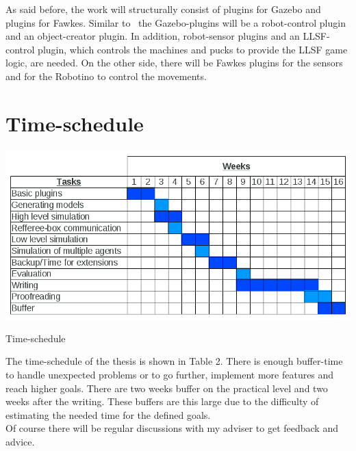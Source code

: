 \documentclass[11pt,a4paper]{article}
\begin{document}
As said before, the work will structurally consist of plugins for Gazebo and plugins for Fawkes. Similar to~\cite{KlingenDA} the Gazebo-plugins will be a robot-control plugin and an object-creator plugin. In addition, robot-sensor plugins and an LLSF-control plugin, which controls the machines and pucks to provide the LLSF game logic,  are needed. On the other side, there will be Fawkes plugins  for the sensors and for the Robotino to control the movements.

\section{Time-schedule}

\begin{table}
\includegraphics[scale=0.43]{pics/Schedule.png}
\label{Table 2}
\caption{Time-schedule}
\end{table}

The time-schedule of the thesis is shown in Table 2. There is enough buffer-time to handle unexpected problems or to go further, implement more features and reach higher goals. There are two weeks buffer on the practical level and two weeks after the writing. These buffers are this large due to the difficulty of estimating the needed time for the defined goals.\\
Of course there will be regular discussions with my adviser to get feedback and advice.
\end{document}
